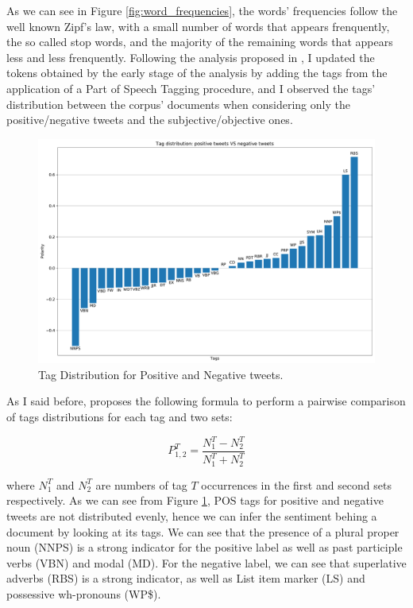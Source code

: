 \documentclass[11pt,twocolumn]{article}
\begin{document}
        \noindent
        As we can see in Figure \ref{fig:word_frequencies}, the words' frequencies follow the well known
        Zipf's law, with a small number of words that appears frenquently, the so called stop words, and the
        majority of the remaining words that appears less and less frenquently. Following the analysis
        proposed in \cite{twitter_as_a_corpus}, I updated the tokens obtained by the early stage of the
        analysis by adding the tags from the application of a Part of Speech Tagging procedure, and I
        observed the tags' distribution between the corpus' documents when considering only the
        positive/negative tweets and the subjective/objective ones.

        \begin{figure}[h]
            \centering
            \includegraphics[width=\linewidth]{../images/tag_distribution_positive_vs_negative.pdf}
            \caption{Tag Distribution for Positive and Negative tweets.}
            \label{fig:tags_pos_vs_neg}
        \end{figure}

        \noindent
        As I said before, \cite{twitter_as_a_corpus} proposes the following formula to perform a pairwise
        comparison of tags distributions for each tag and two sets:

        \begin{equation*}
            P_{1, 2}^T = \frac{N_1^T - N_2^T}{N_1^T + N_2^T}
        \end{equation*}

        \noindent
        where $N_1^T$ and $N_2^T$ are numbers of tag $T$ occurrences in the first and second sets respectively.
        As we can see from Figure \ref{fig:tags_pos_vs_neg}, POS tags for positive and negative tweets are not
        distributed evenly, hence we can infer the sentiment behing a document by looking at its tags. We can
        see that the presence of a plural proper noun (NNPS) is a strong indicator for the positive label as
        well as past participle verbs (VBN) and modal (MD). For the negative label, we can see that superlative
        adverbs (RBS) is a strong indicator, as well as List item marker (LS) and possessive wh-pronouns (WP\$).
\end{document}
